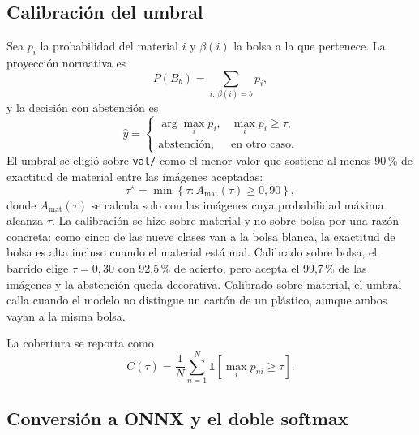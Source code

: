 \documentclass[10pt]{ieeeconf}
\begin{document}
\subsection{Calibraci\'on del umbral}

Sea $p_i$ la probabilidad del material $i$ y $\beta(i)$ la bolsa a la que
pertenece. La proyecci\'on normativa es
\begin{equation}
P(B_b) = \sum_{i:\,\beta(i)=b} p_i,
\label{eq:bolsa}
\end{equation}
y la decisi\'on con abstenci\'on es
\begin{equation}
\hat{y} =
\begin{cases}
\arg\max_i p_i, & \max_i p_i \ge \tau,\\
\text{abstenci\'on}, & \text{en otro caso}.
\end{cases}
\label{eq:tau}
\end{equation}
El umbral se eligi\'o sobre \texttt{val/} como el menor valor que sostiene al
menos 90\,\% de exactitud de material entre las im\'agenes aceptadas:
\begin{equation}
\tau^\star = \min\left\{\tau : A_{\text{mat}}(\tau) \ge 0{,}90\right\},
\label{eq:tauopt}
\end{equation}
donde $A_{\text{mat}}(\tau)$ se calcula solo con las im\'agenes cuya probabilidad
m\'axima alcanza $\tau$. La calibraci\'on se hizo sobre material y no sobre bolsa
por una raz\'on concreta: como cinco de las nueve clases van a la bolsa blanca,
la exactitud de bolsa es alta incluso cuando el material est\'a mal. Calibrado
sobre bolsa, el barrido elige $\tau=0{,}30$ con 92,5\,\% de acierto, pero acepta
el 99,7\,\% de las im\'agenes y la abstenci\'on queda decorativa. Calibrado sobre
material, el umbral calla cuando el modelo no distingue un cart\'on de un
pl\'astico, aunque ambos vayan a la misma bolsa.

La cobertura se reporta como
\begin{equation}
C(\tau) = \frac{1}{N}\sum_{n=1}^{N}\mathbf{1}\left[\max_i p_{ni} \ge \tau\right].
\label{eq:cobertura}
\end{equation}

\subsection{Conversi\'on a ONNX y el doble softmax}
\end{document}
